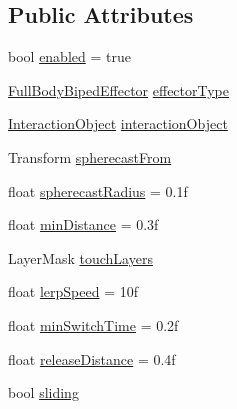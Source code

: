 \subsection*{Public Attributes}
\begin{DoxyCompactItemize}
\item 
bool \mbox{\hyperlink{class_root_motion_1_1_demos_1_1_touch_walls_1_1_effector_link_a4d7ed48db14bce4373795dbd0c1c29f7}{enabled}} = true
\item 
\mbox{\hyperlink{namespace_root_motion_1_1_final_i_k_ae0dd2058c7667b6f132c11a6b860c14a}{Full\+Body\+Biped\+Effector}} \mbox{\hyperlink{class_root_motion_1_1_demos_1_1_touch_walls_1_1_effector_link_ad95c1b2c205ac382d73e96adc685e277}{effector\+Type}}
\item 
\mbox{\hyperlink{class_root_motion_1_1_final_i_k_1_1_interaction_object}{Interaction\+Object}} \mbox{\hyperlink{class_root_motion_1_1_demos_1_1_touch_walls_1_1_effector_link_ad2e71ee75cf5051af38c27d45cd48c04}{interaction\+Object}}
\item 
Transform \mbox{\hyperlink{class_root_motion_1_1_demos_1_1_touch_walls_1_1_effector_link_ae7570f5ea8964939d1be01f1969d48b2}{spherecast\+From}}
\item 
float \mbox{\hyperlink{class_root_motion_1_1_demos_1_1_touch_walls_1_1_effector_link_a6d48ef98f8bd83df8bb002f8e8b7cdff}{spherecast\+Radius}} = 0.\+1f
\item 
float \mbox{\hyperlink{class_root_motion_1_1_demos_1_1_touch_walls_1_1_effector_link_ad429c4909dd802da493f1ba6ca49f760}{min\+Distance}} = 0.\+3f
\item 
Layer\+Mask \mbox{\hyperlink{class_root_motion_1_1_demos_1_1_touch_walls_1_1_effector_link_a05c65e03e34ce7c256848bc01af5f6ea}{touch\+Layers}}
\item 
float \mbox{\hyperlink{class_root_motion_1_1_demos_1_1_touch_walls_1_1_effector_link_aaa205fb0854ec5350dca028c5e16a0f8}{lerp\+Speed}} = 10f
\item 
float \mbox{\hyperlink{class_root_motion_1_1_demos_1_1_touch_walls_1_1_effector_link_a94c2bf45f7348f87c7c94cf25272dd66}{min\+Switch\+Time}} = 0.\+2f
\item 
float \mbox{\hyperlink{class_root_motion_1_1_demos_1_1_touch_walls_1_1_effector_link_af00931613b8335b40fe82c8793884e68}{release\+Distance}} = 0.\+4f
\item 
bool \mbox{\hyperlink{class_root_motion_1_1_demos_1_1_touch_walls_1_1_effector_link_a3624d22fe1c9655d95422839cf4612e0}{sliding}}
\end{DoxyCompactItemize}


